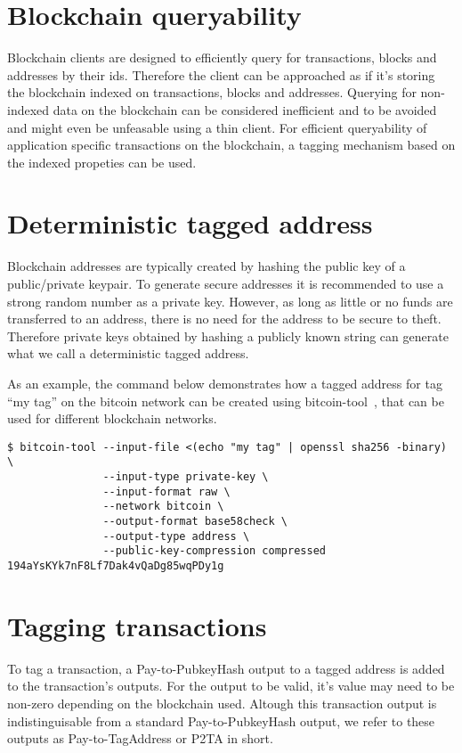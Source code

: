 \documentclass[a4paper,10pt]{article}
\begin{document}
\section{Blockchain queryability}
Blockchain clients are designed to efficiently query for transactions, blocks and addresses by their ids.
Therefore the client can be approached as if it's storing the blockchain indexed on transactions, blocks and addresses.
Querying for non-indexed data on the blockchain can be considered inefficient and to be avoided and might even be unfeasable using a thin client.
For efficient queryability of application specific transactions on the blockchain, a tagging mechanism based on the indexed propeties can be used.

\section{Deterministic tagged address}
\label{sec:taggedaddress}
Blockchain addresses are typically created by hashing the public key of a public/private keypair.
To generate secure addresses it is recommended to use a strong random number as a private key.
However, as long as little or no funds are transferred to an address, there is no need for the address to be secure to theft.
Therefore private keys obtained by hashing a publicly known string can generate what we call a deterministic tagged address.

As an example, the command below demonstrates how a tagged address for tag ``my tag'' on the bitcoin network can be created using bitcoin-tool~\cite{Matja}, that can be used for different blockchain networks.
\begin{verbatim}
$ bitcoin-tool --input-file <(echo "my tag" | openssl sha256 -binary) \
               --input-type private-key \
               --input-format raw \
               --network bitcoin \
               --output-format base58check \
               --output-type address \
               --public-key-compression compressed
194aYsKYk7nF8Lf7Dak4vQaDg85wqPDy1g
\end{verbatim}

\section{Tagging transactions}
To tag a transaction, a Pay-to-PubkeyHash output to a tagged address is added to the transaction's outputs.
For the output to be valid, it's value may need to be non-zero depending on the blockchain used.
Altough this transaction output is indistinguisable from a standard Pay-to-PubkeyHash output, we refer to these outputs as Pay-to-TagAddress or P2TA in short.
\end{document}
